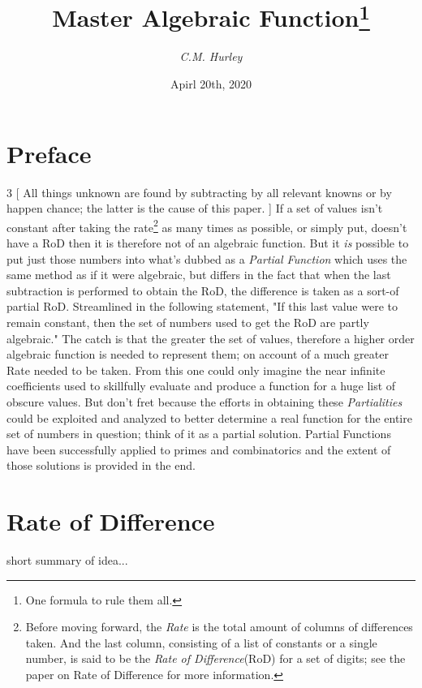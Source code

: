 \documentclass[12pt, letterpaper, twosided]{article}
\title{Master Algebraic Function\footnote{One formula to rule them all.}}
\author{\textit{C.M. Hurley}}
\date{Apirl 20th, 2020}
\begin{document}
	\maketitle
	\newpage %
	\tableofcontents

\newpage
\section*{Preface}%
\begin{multicols}{3}
[
All things unknown are found by subtracting by all relevant knowns or by happen chance; the latter is the cause of this paper.
]
\hspace{0.5cm}If a set of values isn't constant after taking the rate\footnote{Before moving forward, the \textit{Rate} is the total amount of columns of differences taken. And the last column, consisting of a list of constants or a single number, is said to be the \textit{Rate of Difference}(RoD) for a set of digits; see the paper on Rate of Difference for more information.} as many times as possible, or simply put, doesn't have a RoD then it  is therefore not of an algebraic function. But it \textit{is} possible to put just those numbers into what's dubbed as a \textit{Partial Function} which uses the same method as if it were algebraic, but differs in the fact that when the last subtraction is performed to obtain the RoD, the difference is taken as a sort-of partial RoD. Streamlined in the following statement, "If this last value were to remain constant, then the set of numbers used to get the RoD are partly algebraic." The catch is that the greater the set of values, therefore a higher order algebraic function is needed to represent them; on account of a much greater Rate needed to be taken. From this one could only imagine the near infinite coefficients used to skillfully evaluate and produce a function for a huge list of obscure values. But don't fret because the efforts in obtaining these \textit{Partialities} could be exploited and analyzed to better determine a real function for the entire set of numbers in question; think of it as a partial solution.
\newline Partial Functions have been successfully applied to primes and combinatorics and the extent of those solutions is provided in the end.
\end{multicols}



\newpage
\section{Rate of Difference}%
\setcounter{page}{1}
\hspace{0.5cm}short summary of idea...
\end{document}
